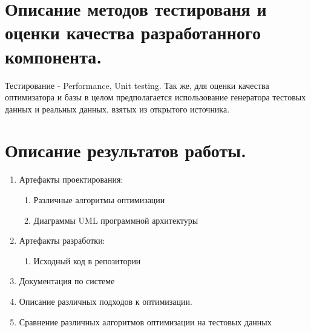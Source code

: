 \documentclass[12pt]{article}
\begin{document}
    \section{Описание методов тестированя и оценки качества разработанного компонента.}
        Тестирование - Performance, Unit testing. Так же, для оценки качества оптимизатора и базы в целом предполагается использование генератора тестовых данных и реальных данных, взятых из открытого источника.
    \section{Описание результатов работы.}
        \begin{enumerate}\itemsep1pt \parskip0pt 
            \item Артефакты проектирования:
                \begin{enumerate}\itemsep1pt \parskip0pt  
                    \item Различные алгоритмы оптимизации
                    \item Диаграммы UML программной архитектуры
                \end{enumerate}
            \item Артефакты разработки:
                \begin{enumerate}\itemsep1pt \parskip0pt  
                    \item Исходный код в репозитории
                \end{enumerate}
            \item Документация по системе
            \item Описание различных подходов к оптимизации.
            \item Сравнение различных алгоритмов оптимизации на тестовых данных
        \end{enumerate}
\end{document}

